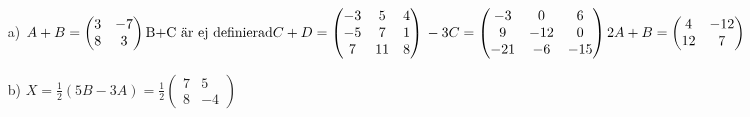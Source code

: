 \begin{enumerate}
    \item[a)]
        \begin{math}
            A+B
            =\begin{pmatrix}
                3 & -7\\
                8 & 3
            \end{pmatrix}
            \\
            \text{B+C är ej definierad}
            \\
            C+D
            =\begin{pmatrix}
                -3 & 5 & 4\\
                -5 & 7 & 1\\
                7 & 11 & 8
            \end{pmatrix}
            \\
            -3C
            =\begin{pmatrix}
                -3 & 0 & 6\\
                9 & -12 & 0\\
                -21 & -6 & -15
            \end{pmatrix}
            \\
            2A+B
            =\begin{pmatrix}
                4 & -12\\
                12 & 7
            \end{pmatrix}
        \end{math}
    \item[b)]
        \begin{math}
            X
            =\frac{1}{2}(5B-3A)
            =\frac{1}{2}\begin{pmatrix}
                7 & 5\\
                8 & -4
            \end{pmatrix}
        \end{math}
\end{enumerate}